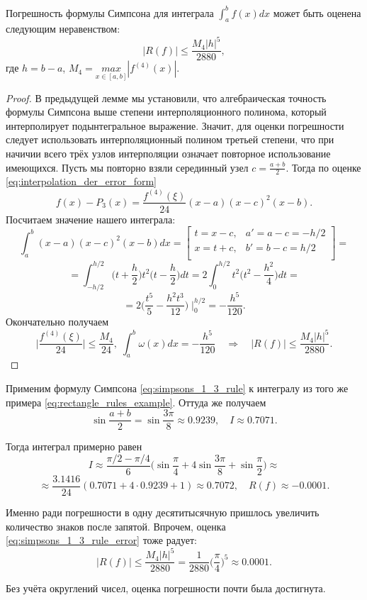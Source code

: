 \documentclass[../main.tex]{subfile}
\begin{document}
\begin{theorem}
\label{eq:simpsons_1_3_rule_error}
	Погрешность формулы Симпсона для интеграла $\int_a^b f(x)dx$ может быть
	оценена следующим неравенством:
	\[\boxed{|R(f)|\le\frac{M_4|h|^5}{2880}},\]
	где $h=b-a$, $M_4=\underset{x\in[a,b]}{max}|f^{(4)}(x)|.$
\end{theorem}

\begin{proof}
	В предыдущей лемме мы установили, что алгебраическая точность формулы
	Симпсона выше степени интерполяционного полинома, который интерполирует
	подынтегральное выражение. Значит, для оценки погрешности следует
	использовать интерполяционный полином третьей степени, что при начичии
	всего трёх узлов интерполяции означает повторное использование
	имеющихся. Пусть мы повторно взяли серединный узел $c=\frac{a+b}{2}$.
	Тогда по оценке \eqref{eq:interpolation_der_error_form}
	\[f(x)-P_3(x)=\frac{f^{(4)}(\xi)}{24}(x-a)(x-c)^2(x-b).\]
	Посчитаем значение нашего интеграла:
	\[\int_a^b (x-a)(x-c)^2(x-b)dx=
		\begin{bmatrix}
			t=x-c,	& a'=a-c=-h/2 \\
			x=t+c,	& b'=b-c=h/2\\
		\end{bmatrix}
		=
	\]
	\[=\int_{-h/2}^{h/2}\Big(t+\frac{h}{2}\Big)t^2\Big(t-\frac{h}{2}\Big)dt=
	2\int_0^{h/2}t^2\Big(t^2-\frac{h^2}{4}\Big)dt=\]
	\[=2\Big(\frac{t^5}{5}-\frac{h^2t^3}{12}\Big)\;\Big|_0^{h/2}=
	-\frac{h^5}{120}.\]
	Окончательно получаем
	\[\Big|\frac{f^{(4)}(\xi)}{24}\Big|\le\frac{M_4}{24},\;\int_a^b\omega(x)
	dx=-\frac{h^5}{120}\quad\Rightarrow\quad|R(f)|\le\frac{M_4|h|^5}{2880}.\]
\end{proof}

\begin{example}\label{eq:simpsons_1_3_rule_example}
	Применим формулу Симпсона \eqref{eq:simpsons_1_3_rule} к интегралу из
	того же примера \eqref{eq:rectangle_rules_example}. Оттуда же получаем
	\[\sin{\frac{a+b}{2}}=\sin{\frac{3\pi}{8}}\approx 0.9239,\quad I\approx
	0.7071.\]

	Тогда интеграл примерно равен
	\[I\approx\frac{\pi/2-\pi/4}{6}\Big(\sin\frac{\pi}{4}+4\sin\frac{3\pi}
	{8}+\sin\frac{\pi}{2}\Big)\approx\]
	\[\approx\frac{3.1416}{24}(0.7071+4\cdot0.9239+1)\approx0.7072,\quad
	R(f)\approx -0.0001.\]

	Именно ради погрешности в одну десятитысячную пришлось увеличить
	количество знаков после запятой. Впрочем, оценка
	\eqref{eq:simpsons_1_3_rule_error} тоже радует:
	\[|R(f)|\le\frac{M_4|h|^5}{2880}=\frac{1}{2880}\Big(\frac{\pi}{4}
	\Big)^5\approx 0.0001.\]

	Без учёта округлений чисел, оценка погрешности почти была достигнута.
\end{example}
\end{document}
